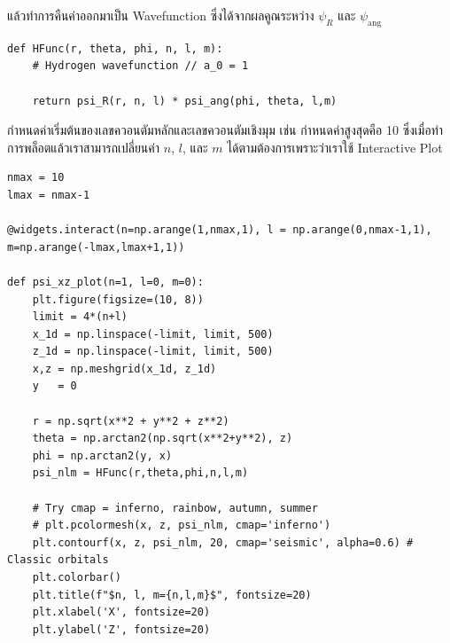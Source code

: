 \noindent แล้วทำการคืนค่าออกมาเป็น Wavefunction ซึ่งได้จากผลคูณระหว่าง $\psi_{R}$ และ $\psi_{\text{ang}}$

\begin{lstlisting}[style=MyPython]
def HFunc(r, theta, phi, n, l, m):
    # Hydrogen wavefunction // a_0 = 1

    return psi_R(r, n, l) * psi_ang(phi, theta, l,m)
\end{lstlisting}

\noindent กำหนดค่าเริ่มต้นของเลขควอนตัมหลักและเลขควอนตัมเชิงมุม เช่น กำหนดค่าสูงสุดคือ 10 ซึ่งเมื่อทำการพล็อตแล้วเราสามารถเปลี่ยนค่า
$n$, $l$, และ $m$ ได้ตามต้องการเพราะว่าเราใช้ Interactive Plot

\begin{lstlisting}[style=MyPython]
nmax = 10
lmax = nmax-1

@widgets.interact(n=np.arange(1,nmax,1), l = np.arange(0,nmax-1,1), m=np.arange(-lmax,lmax+1,1))

def psi_xz_plot(n=1, l=0, m=0):
    plt.figure(figsize=(10, 8))
    limit = 4*(n+l)
    x_1d = np.linspace(-limit, limit, 500)
    z_1d = np.linspace(-limit, limit, 500)
    x,z = np.meshgrid(x_1d, z_1d)
    y   = 0
    
    r = np.sqrt(x**2 + y**2 + z**2)
    theta = np.arctan2(np.sqrt(x**2+y**2), z)
    phi = np.arctan2(y, x)
    psi_nlm = HFunc(r,theta,phi,n,l,m)
    
    # Try cmap = inferno, rainbow, autumn, summer
    # plt.pcolormesh(x, z, psi_nlm, cmap='inferno')
    plt.contourf(x, z, psi_nlm, 20, cmap='seismic', alpha=0.6) # Classic orbitals
    plt.colorbar()
    plt.title(f"$n, l, m={n,l,m}$", fontsize=20)
    plt.xlabel('X', fontsize=20)
    plt.ylabel('Z', fontsize=20)
\end{lstlisting}

\medskip

